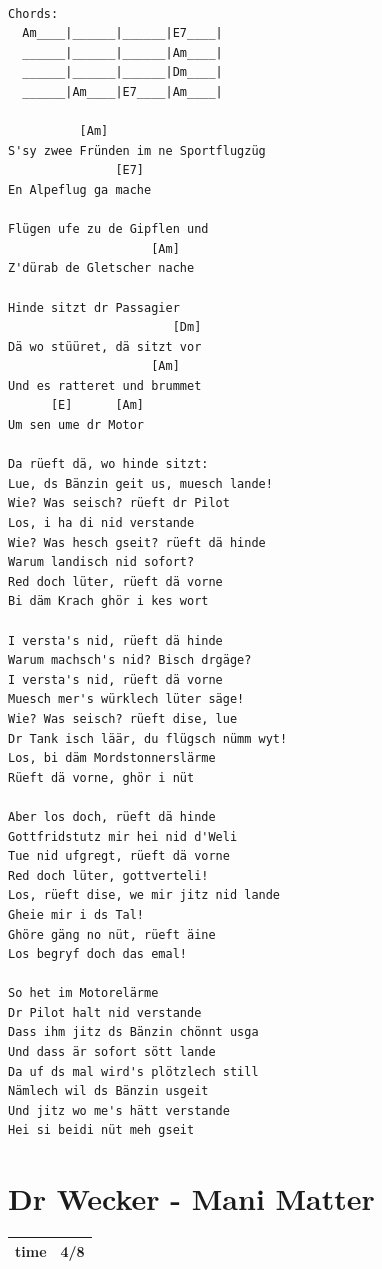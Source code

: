\documentclass[
]{book}
\let\stdsection\section
\renewcommand\section{\clearpage\stdsection}
\begin{document}
\begin{verbatim}

Chords:
  Am____|______|______|E7____|
  ______|______|______|Am____|
  ______|______|______|Dm____|
  ______|Am____|E7____|Am____|

          [Am]
S'sy zwee Fründen im ne Sportflugzüg
               [E7]
En Alpeflug ga mache

Flügen ufe zu de Gipflen und
                    [Am]
Z'dürab de Gletscher nache

Hinde sitzt dr Passagier
                       [Dm]
Dä wo stüüret, dä sitzt vor
                    [Am]
Und es ratteret und brummet
      [E]      [Am]
Um sen ume dr Motor

Da rüeft dä, wo hinde sitzt:
Lue, ds Bänzin geit us, muesch lande!
Wie? Was seisch? rüeft dr Pilot
Los, i ha di nid verstande
Wie? Was hesch gseit? rüeft dä hinde
Warum landisch nid sofort?
Red doch lüter, rüeft dä vorne
Bi däm Krach ghör i kes wort

I versta's nid, rüeft dä hinde
Warum machsch's nid? Bisch drgäge?
I versta's nid, rüeft dä vorne
Muesch mer's würklech lüter säge!
Wie? Was seisch? rüeft dise, lue
Dr Tank isch läär, du flügsch nümm wyt!
Los, bi däm Mordstonnerslärme
Rüeft dä vorne, ghör i nüt

Aber los doch, rüeft dä hinde
Gottfridstutz mir hei nid d'Weli
Tue nid ufgregt, rüeft dä vorne
Red doch lüter, gottverteli!
Los, rüeft dise, we mir jitz nid lande
Gheie mir i ds Tal!
Ghöre gäng no nüt, rüeft äine
Los begryf doch das emal!

So het im Motorelärme
Dr Pilot halt nid verstande
Dass ihm jitz ds Bänzin chönnt usga
Und dass är sofort sött lande
Da uf ds mal wird's plötzlech still
Nämlech wil ds Bänzin usgeit
Und jitz wo me's hätt verstande
Hei si beidi nüt meh gseit 

\end{verbatim}

\hypertarget{dr-wecker---mani-matter}{%
\section{Dr Wecker - Mani Matter}\label{dr-wecker---mani-matter}}

\begin{longtable}[]{@{}ll@{}}
\toprule
\endhead
time & 4/8\tabularnewline
\bottomrule
\end{longtable}
\end{document}

